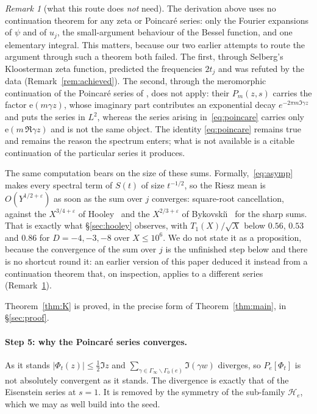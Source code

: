 \documentclass[11pt,a4paper]{article}
\theoremstyle{remark}\newtheorem{remark}[theorem]{Remark}
\newcommand{\e}{\mathrm e}\newcommand{\Off}{\mathrm{Off}}\newcommand{\rep}[2]{\langle #1\rangle_{#2}}
\begin{document}
\begin{remark}[what this route does \emph{not} need]\label{rem:notneeded}
The derivation above uses no continuation theorem for any zeta or Poincar\'e series: only the Fourier expansions of
$\psi$ and of $u_j$, the small-argument behaviour of the Bessel function, and one elementary integral. This matters,
because our two earlier attempts to route the argument through such a theorem both failed. The first, through
Selberg's Kloosterman zeta function, predicted the frequencies $2t_j$ and was refuted by the data
(Remark~\ref{rem:achieved}). The second, through the meromorphic continuation of the Poincar\'e series of
\cite{GoldfeldSarnak1983}, does not apply: their $P_m(z,s)$ carries the factor $\e(m\gamma z)$, whose imaginary part
contributes an exponential decay $e^{-2\pi m\Im\gamma z}$ and puts the series in $L^2$, whereas the series arising
in~\eqref{eq:poincare} carries only $\e(m\,\Re\gamma z)$ and is not the same object. The identity
\eqref{eq:poincare} remains true and remains the reason the spectrum enters; what is not available is a citable
continuation of the particular series it produces.
\end{remark}

The same computation bears on the size of these sums. Formally,~\eqref{eq:asymp} makes every spectral term of $S(t)$
of size $t^{-1/2}$, so the Riesz mean is $O(Y^{1/2+\varepsilon})$ as soon as the sum over $j$ converges: square-root
cancellation, against the $X^{3/4+\varepsilon}$ of Hooley~\cite{Hooley1963} and the $X^{2/3+\varepsilon}$ of
Bykovski\u\i~\cite{Bykovskii1984} for the sharp sums. That is exactly what \S\ref{sec:hooley} observes, with
$T_1(X)/\sqrt X$ below $0.56$, $0.53$ and $0.86$ for $D=-4,-3,-8$ over $X\le10^6$. We do not state it as a
proposition, because the convergence of the sum over $j$ is the unfinished step below and there is no shortcut round
it: an earlier version of this paper deduced it instead from a continuation theorem that, on inspection, applies to a
different series (Remark~\ref{rem:notneeded}).

Theorem~\ref{thm:K} is proved, in the precise form of Theorem~\ref{thm:main}, in \S\ref{sec:proof}.

\paragraph{Step 5: why the Poincar\'e series converges.} As it stands $|\Phi_t(z)|\le\tfrac12\Im z$ and
$\sum_{\gamma\in\Gamma_\infty\backslash\Gamma_0(e)}\Im(\gamma w)$ diverges, so $P_e[\Phi_t]$ is not absolutely convergent as
it stands. The divergence is exactly that of the Eisenstein series at $s=1$. It is removed by the symmetry of the sub-family $\mathcal H_e$,
which we may as well build into the seed.
\end{document}
